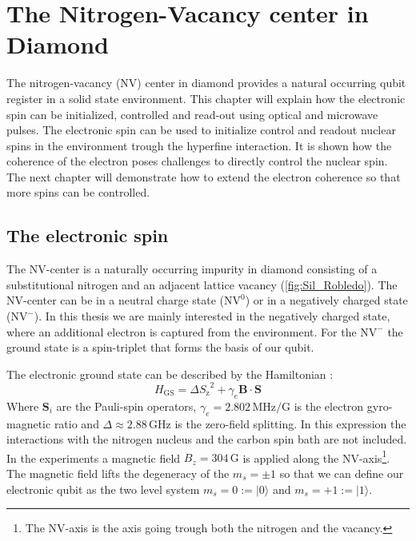 \chapter{The Nitrogen-Vacancy center in Diamond}
The nitrogen-vacancy (NV) center in diamond provides a natural occurring qubit register in a solid state environment.
This chapter will explain how the electronic spin can be initialized, controlled and read-out using optical and microwave pulses.
The electronic spin can be used to initialize control and readout nuclear spins in the environment trough the hyperfine interaction.
It is shown how the coherence of the electron poses challenges to directly control the nuclear spin.
The next chapter will demonstrate how to extend the electron coherence so that more spins can be controlled.

\section{The electronic spin}
The NV-center is a naturally occurring impurity in diamond consisting of a substitutional nitrogen and an adjacent lattice vacancy (\cref{fig:Sil_Robledo}).
The NV-center can be in a neutral charge state ($\mathrm{NV}^0$) or in a negatively charged state ($\mathrm{NV}^-$).
In this thesis we are mainly interested in the negatively charged state, where an additional electron is captured from the environment.
For the $\mathrm{NV}^-$ the ground state is a spin-triplet that forms the basis of our qubit.

The electronic ground state can be described by the Hamiltonian \citep{Bernien2014Control}:
 \begin{equation}
H_\mathrm{GS} = \Delta {{S}_\mathrm{z}}^2 + \gamma_e \bm{B} \cdot \bm{S}
\end{equation}
Where $\bm{S}_i$ are the Pauli-spin operators,  $\gamma_e  = 2.802\,\mathrm{ MHz/G}$  is the electron gyro-magnetic ratio and $\Delta \approx 2.88\, \mathrm{GHz}$ is the zero-field splitting.
In this expression the interactions with the nitrogen nucleus and the carbon spin bath are not included.
In the experiments a magnetic field $B_z = 304\,\mathrm{G}$ is applied along the NV-axis\footnote{The NV-axis is the axis going trough both the nitrogen and the vacancy. }.
The magnetic field lifts the degeneracy of the $m_s = \pm 1$ so that we can define our electronic qubit  as the two level system  $m_s=0:=|0\rangle$ and $m_s = +1 := |1\rangle$.

